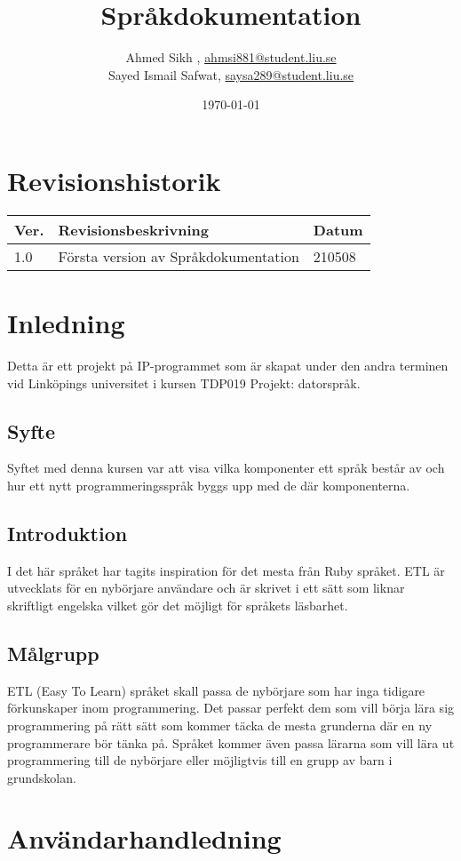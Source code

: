 \documentclass{TDP019mall}
\author{Ahmed Sikh , \url{ahmsi881@student.liu.se}\\
Sayed Ismail Safwat, \url{saysa289@student.liu.se}}
\title{Språkdokumentation}
\date{\today}
\begin{document}
\projectpage
\tableofcontents
\newpage
\section{Revisionshistorik}
\begin{table}[!h]
\begin{tabularx}{\linewidth}{|l|X|l|}
\hline
Ver. & Revisionsbeskrivning & Datum \\\hline
1.0 & Första version av Språkdokumentation & 210508 \\\hline
\end{tabularx}
\end{table}



\section{Inledning}
Detta är ett projekt på IP-programmet som är skapat under den andra terminen vid Linköpings universitet i kursen TDP019 Projekt: datorspråk.

\subsection{Syfte}
Syftet med denna kursen var att visa vilka komponenter ett språk består av och hur ett nytt programmeringsspråk byggs upp med de där komponenterna. 

\subsection{Introduktion}
I det här språket har tagits inspiration för det mesta från Ruby språket. ETL är utvecklats för en nybörjare användare och är skrivet i ett sätt som 
liknar skriftligt engelska vilket gör det möjligt för språkets läsbarhet.

\subsection{Målgrupp}
ETL (Easy To Learn) språket skall passa de nybörjare som har inga tidigare förkunskaper inom programmering. Det passar perfekt dem som vill börja lära 
sig programmering på rätt sätt som kommer täcka de mesta grunderna där en ny programmerare bör tänka på. Språket kommer även passa lärarna som vill lära
ut programmering till de nybörjare eller möjligtvis till en grupp av barn i grundskolan.


\section{Användarhandledning}
\end{document}
